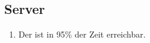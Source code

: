\subsection{Server}

\begin{enumerate}
    \item Der %
        ist in 95\% der Zeit erreichbar. 
\end{enumerate}